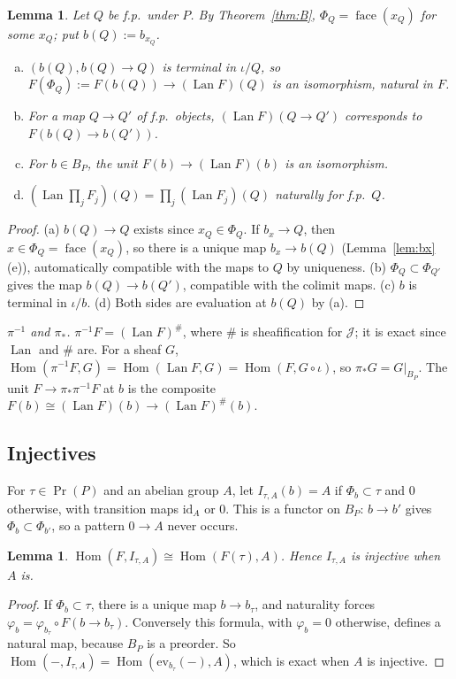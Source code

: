 \documentclass[11pt]{article}
\newtheorem{lemma}[theorem]{Lemma}
\theoremstyle{definition}
\theoremstyle{remark}
\newcommand{\face}{\operatorname{face}}
\newcommand{\Prin}{\operatorname{Pr}}
\newcommand{\Hom}{\operatorname{Hom}}
\newcommand{\Lan}{\operatorname{Lan}}
\newcommand{\cJ}{\mathcal{J}}
\begin{document}
\begin{lemma}\label{lem:lanfp}
Let $Q$ be f.p.\ under $P$. By Theorem~\ref{thm:B}, $\Phi_Q=\face(x_Q)$ for some $x_Q$; put $b(Q):=b_{x_Q}$.
\begin{enumerate}[(a)]
\item $(b(Q),b(Q)\to Q)$ is terminal in $\iota/Q$, so $F(\Phi_Q):=F(b(Q))\to(\Lan F)(Q)$ is an isomorphism, natural in $F$.
\item For a map $Q\to Q'$ of f.p.\ objects, $(\Lan F)(Q\to Q')$ corresponds to $F(b(Q)\to b(Q'))$.
\item For $b\in B_P$, the unit $F(b)\to(\Lan F)(b)$ is an isomorphism.
\item $(\Lan\prod_jF_j)(Q)=\prod_j(\Lan F_j)(Q)$ naturally for f.p.\ $Q$.
\end{enumerate}
\end{lemma}
\begin{proof}
(a) $b(Q)\to Q$ exists since $x_Q\in\Phi_Q$. If $b_x\to Q$, then $x\in\Phi_Q=\face(x_Q)$, so there is a unique map $b_x\to b(Q)$ (Lemma~\ref{lem:bx}(e)), automatically compatible with the maps to $Q$ by uniqueness. (b) $\Phi_Q\subset\Phi_{Q'}$ gives the map $b(Q)\to b(Q')$, compatible with the colimit maps. (c) $b$ is terminal in $\iota/b$. (d) Both sides are evaluation at $b(Q)$ by (a).
\end{proof}

\emph{$\pi^{-1}$ and $\pi_*$.} $\pi^{-1}F=(\Lan F)^\#$, where $\#$ is sheafification for $\cJ$; it is exact since $\Lan$ and $\#$ are. For a sheaf $G$, $\Hom(\pi^{-1}F,G)=\Hom(\Lan F,G)=\Hom(F,G\circ\iota)$, so \textbf{$\pi_*G=G|_{B_P}$}. The unit $F\to\pi_*\pi^{-1}F$ at $b$ is the composite $F(b)\cong(\Lan F)(b)\to(\Lan F)^\#(b)$.

\subsection{Injectives}
For $\tau\in\Prin(P)$ and an abelian group $A$, let $I_{\tau,A}(b)=A$ if $\Phi_b\subset\tau$ and $0$ otherwise, with transition maps $\mathrm{id}_A$ or $0$. This is a functor on $B_P$: $b\to b'$ gives $\Phi_b\subset\Phi_{b'}$, so a pattern $0\to A$ never occurs.

\begin{lemma}\label{lem:inj}
$\Hom(F,I_{\tau,A})\cong\Hom(F(\tau),A)$. Hence $I_{\tau,A}$ is injective when $A$ is.
\end{lemma}
\begin{proof}
If $\Phi_b\subset\tau$, there is a unique map $b\to b_\tau$, and naturality forces $\varphi_b=\varphi_{b_\tau}\circ F(b\to b_\tau)$. Conversely this formula, with $\varphi_b=0$ otherwise, defines a natural map, because $B_P$ is a preorder. So $\Hom(-,I_{\tau,A})=\Hom(\mathrm{ev}_{b_\tau}(-),A)$, which is exact when $A$ is injective.
\end{proof}
\end{document}

